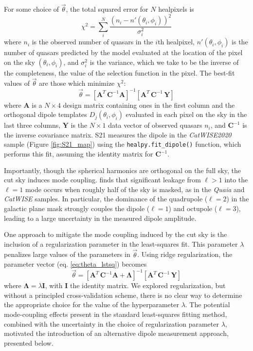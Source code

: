 \documentclass[modern]{aastex631}
\newcommand{\catwise}{\textsl{CatWISE}\xspace}
\newcommand{\catwisetwentytwenty}{\textsl{CatWISE2020}\xspace}
\newcommand{\quaia}{\textsl{Quaia}\xspace}
\begin{document}
For some choice of $\vec\theta$, the total squared error for $N$ healpixels is
\begin{equation}
\label{eq:chisq}
    \chi^2 = \sum_i^{N} \frac{\left(n_i - n'(\theta_i,\phi_i)\right)^2}{\sigma_i^2}
\end{equation}
where $n_i$ is the observed number of quasars in the $i$th healpixel, $n'(\theta_i,\phi_i)$ is the number of quasars predicted by the model evaluated at the location of the pixel on the sky $(\theta_i,\phi_i)$, and $\sigma_i^2$ is the variance, which we take to be the inverse of the completeness, the value of the selection function in the pixel.
The best-fit values of $\vec\theta$ are those which minimize $\chi^2$:
\begin{equation}
\label{eq:theta_lstsq}
    \vec\theta = \left[\bm{A}^T\,\bm{C}^{-1}\bm{A} \right]^{-1}\left[\bm{A}^T\,\bm{C}^{-1}\,\bm{Y}\right]
\end{equation}
where $\bm{A}$ is a $N\times 4$ design matrix containing ones in the first column and the orthogonal dipole templates $D_j(\theta_i,\phi_i)$ evaluated in each pixel on the sky in the last three columns, $\bm{Y}$ is the $N\times 1$ data vector of observed quasars $n_i$, and $\bm{C}^{-1}$ is the inverse covariance matrix.
S21 measures the dipole in the \catwisetwentytwenty sample (Figure \ref{fig:S21_map}) using the \texttt{healpy.fit\_dipole()} function, which performs this fit, assuming the identity matrix for $\bm{C}^{-1}$.

Importantly, though the spherical harmonics are orthogonal on the full sky, the cut sky induces mode coupling.
\citet{abghari_reassessment_2024} finds that significant leakage from $\ell >1$ into the $\ell=1$ mode occurs when roughly half of the sky is masked, as in the \quaia and \catwise samples.
In particular, the dominance of the quadrupole ($\ell=2$) in the galactic plane mask strongly couples the dipole ($\ell=1$) and octupole ($\ell=3$), leading to a large uncertainty in the measured dipole amplitude.

One approach to mitigate the mode coupling induced by the cut sky is the inclusion of a regularization parameter in the least-squares fit.
This parameter $\lambda$ penalizes large values of the parameters in $\vec\theta$.
Using ridge regularization, the parameter vector (eq. \ref{eq:theta_lstsq}) becomes
\begin{equation}
    \vec\theta = \left[\bm{A}^T\,\bm{C}^{-1}\bm{A} + \bm\Lambda\right]^{-1}\left[\bm{A}^T\,\bm{C}^{-1}\,\bm{Y}\right]
\end{equation}
where $\bm{\Lambda}=\lambda\bm{I}$, with $\bm{I}$ the identity matrix.
We explored regularization, but without a principled cross-validation scheme, there is no clear way to determine the appropriate choice for the value of the hyperparameter $\lambda$.
The potential mode-coupling effects present in the standard least-squares fitting method, combined with the uncertainty in the choice of regularization parameter $\lambda$, motivated the introduction of an alternative dipole measurement approach, presented below.
\end{document}
